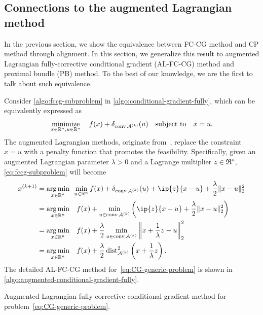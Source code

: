 \subsection{Connections to the augmented Lagrangian method}

In the previous section, we show the equivalence between FC-CG method and CP method through alignment. In this section, we generalize this result to augmented Lagrangian fully-corrective conditional gradient (AL-FC-CG) method and proximal bundle (PB) method. To the best of our knowledge, we are the first to talk about such equivalence.

Consider \autoref{algo:fccg-subproblem} in \autoref{algo:conditional-gradient-fully}, which can be equivalently expressed as 
\begin{equation} \label{eq:fccg-subproblem}
  \displaystyle\mathop{\hbox{\rm minimize}}_{x\in\mathbb{R}^n, u\in\mathbb{R}^n}\enspace\enspace f(x) + \delta_{\operatorname{conv}\mathcal{A}^{(k)}}(u) \ \enspace\mathop{\hbox{\rm subject to}}\enspace \ x = u.
\end{equation}
The augmented Lagrangian methods, originate from~\citet{hest:1969}, replace the
constraint $x = u$ with a penalty function that promotes the feasibility.
Specifically, given an augmented Lagrangian parameter $\lambda>0$ and a Lagrange
multiplier $z\in\Re^n$, \eqref{eq:fccg-subproblem} will become
\begin{align}
  x\kp1 &= \argmin{x\in\Re^n} \min_{u\in\Re^n} f(x) + \delta_{\conv\Ascr\k}(u) + \ip{z}{x - u} + \frac{\lambda}{2}\|x - u\|_2^2\nonumber
  \\&= \argmin{x\in\Re^n}\enspace f(x) + \min_{u \in \conv\Ascr\k} \bigg(\ip{z}{x - u} + \frac{\lambda}{2}\|x - u\|_2^2\bigg)\nonumber
  \\&= \argmin{x\in\Re^n}\enspace f(x) + \frac{\lambda}{2} \min_{u \in \conv\Ascr\k} \left\|x + \frac{1}{\lambda}z - u\right\|_2^2\nonumber 
  \\&= \argmin{x\in\Re^n}\enspace f(x) + \frac{\lambda}{2}\dist_{\Ascr\k}^2\left(x + \frac{1}{\lambda}z\right)\label{eq:augmented-lagrangian}.
\end{align}
The detailed AL-FC-CG method for~\eqref{eq:CG-generic-problem} is shown in \autoref{algo:augmented-conditional-gradient-fully}.  

\begin{algorithm}[t]
  \DontPrintSemicolon\setcounter{AlgoLine}{-1}
  \caption{Augmented Lagrangian fully-corrective conditional gradient method
   for problem~\eqref{eq:CG-generic-problem}.}
  \label{algo:augmented-conditional-gradient-fully}
\end{algorithm}

